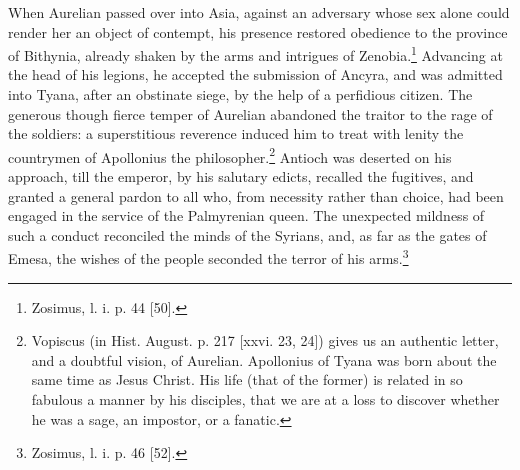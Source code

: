 When Aurelian passed over into Asia, against an adversary whose sex alone could render her an object of contempt, his presence restored obedience to the province of Bithynia, already shaken by the arms and intrigues of Zenobia.\footnote{Zosimus, l. i. p. 44 [50].} Advancing at the head of his legions, he accepted the submission of Ancyra, and was admitted into Tyana, after an obstinate siege, by the help of a perfidious citizen. The generous though fierce temper of Aurelian abandoned the traitor to the rage of the soldiers: a superstitious reverence induced him to treat with lenity the countrymen of Apollonius the philosopher.\footnote{Vopiscus (in Hist. August. p. 217 [xxvi. 23, 24]) gives us an authentic letter, and a doubtful vision, of Aurelian. Apollonius of Tyana was born about the same time as Jesus Christ. His life (that of the former) is related in so fabulous a manner by his disciples, that we are at a loss to discover whether he was a sage, an impostor, or a fanatic.} Antioch was deserted on his approach, till the emperor, by his salutary edicts, recalled the fugitives, and granted a general pardon to all who, from necessity rather than choice, had been engaged in the service of the Palmyrenian queen. The unexpected mildness of such a conduct reconciled the minds of the Syrians, and, as far as the gates of Emesa, the wishes of the people seconded the terror of his arms.\footnote{Zosimus, l. i. p. 46 [52].}

